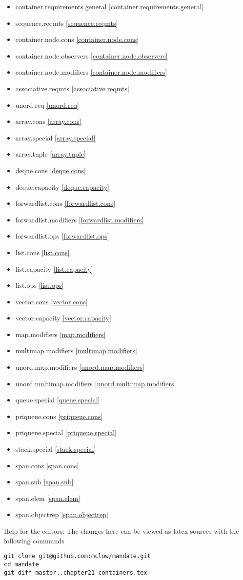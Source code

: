 \begin{multicols}{2}
\begin{itemize}
\item{container.requirements.general  \ref{container.requirements.general}}
\item{sequence.reqmts      \ref{sequence.reqmts}}
\item{container.node.cons       \ref{container.node.cons}}
\item{container.node.observers   \ref{container.node.observers}}
\item{container.node.modifiers              \ref{container.node.modifiers}}
\item{associative.reqmts          \ref{associative.reqmts}}
\item{unord.req            \ref{unord.req}}

\item{array.cons               \ref{array.cons}}
\item{array.special             \ref{array.special}}
\item{array.tuple              \ref{array.tuple}}
\item{deque.cons          \ref{deque.cons}}
\item{deque.capacity            \ref{deque.capacity}}
\item{forwardlist.cons          \ref{forwardlist.cons}}
\item{forwardlist.modifiers  \ref{forwardlist.modifiers}}
\item{forwardlist.ops   \ref{forwardlist.ops}}
\item{list.cons   \ref{list.cons}}
\item{list.capacity   \ref{list.capacity}}
\item{list.ops   \ref{list.ops}}
\item{vector.cons   \ref{vector.cons}}
\item{vector.capacity   \ref{vector.capacity}}

\item{map.modifiers   \ref{map.modifiers}}
\item{multimap.modifiers   \ref{multimap.modifiers}}
\item{unord.map.modifiers  \ref{unord.map.modifiers}}
\item{unord.multimap.modifiers  \ref{unord.multimap.modifiers}}

\item{queue.special  \ref{queue.special}}
\item{priqueue.cons  \ref{priqueue.cons}}
\item{priqueue.special  \ref{priqueue.special}}
\item{stack.special  \ref{stack.special}}
\item{span.cons  \ref{span.cons}}

\item{span.sub  \ref{span.sub}}
\item{span.elem  \ref{span.elem}}
\item{span.objectrep  \ref{span.objectrep}}
\end{itemize}
\end{multicols}

\vfill
Help for the editors: The changes here can be viewed as latex sources with the following commands
\begin{verbatim}
git clone git@github.com:mclow/mandate.git
cd mandate
git diff master..chapter21 containers.tex
\end{verbatim}
\newpage
